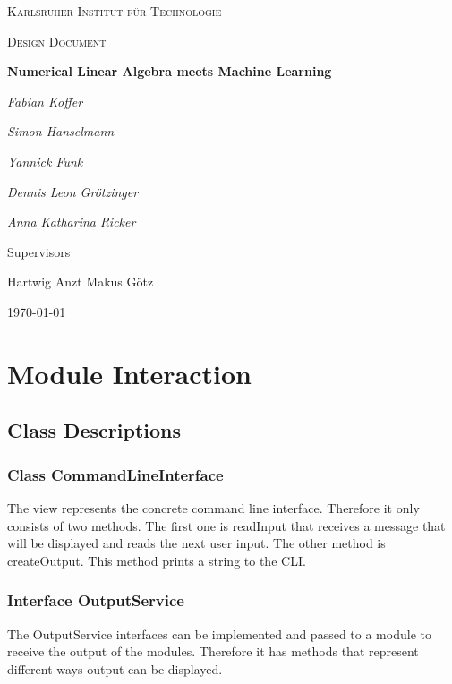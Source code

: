 \documentclass[parskip=full]{scrartcl}
\begin{document}
\begin{titlepage}
\centering
{\scshape\LARGE Karlsruher Institut für Technologie\par}
\vspace{1cm}
{\scshape\Large Design Document\par}
\vspace{1.5cm}
{\huge\bfseries Numerical Linear Algebra meets Machine Learning \par}
\vspace {2cm}

{\Large\itshape Fabian Koffer\par}
{\Large\itshape Simon Hanselmann\par}
{\Large\itshape Yannick Funk\par}
{\Large\itshape Dennis Leon Gr\"{o}tzinger\par}
{\Large\itshape Anna Katharina Ricker\par}

\vfill
Supervisors\par
Hartwig Anzt
Makus G\"{o}tz

\vfill
{\large\today\par}
\end{titlepage}

\tableofcontents
\newpage


\section{Module Interaction}

\subsection{Class Descriptions}

\subsubsection{Class CommandLineInterface}
The view represents the concrete command line interface. 
Therefore it only consists of two methods. 
The first one is readInput that receives a message that will be displayed and reads the next user input. 
The other method is createOutput. 
This method prints a string to the CLI.

\subsubsection{Interface OutputService}
The OutputService interfaces can be implemented and passed to a module to receive the output of the modules. 
Therefore it has methods that represent different ways output can be displayed. 
\end{document}
